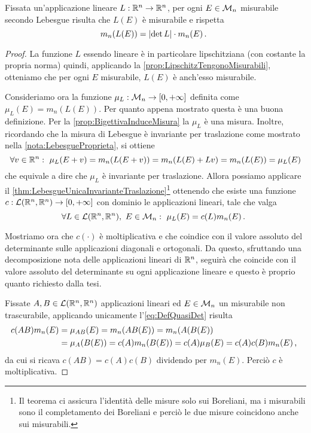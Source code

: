 \begin{proposition}\label{prop:MisuraImmagineLineare}
	Fissata un'applicazione lineare $L:\mathbb R^n\to\mathbb R^n$, per ogni $E\in\mathcal M_n$ misurabile secondo Lebesgue risulta che $L(E)$ è misurabile e rispetta
	\begin{equation}
		m_n(L(E))=\lvert \det L\rvert\cdot m_n(E)\, \text{. }
	\end{equation}
\end{proposition}
\begin{proof}
	La funzione $L$ essendo lineare è in particolare lipschitziana (con costante la propria norma) quindi, applicando la \cref{prop:LipschitzTengonoMisurabili}, otteniamo che per ogni $E$ misurabile, $L(E)$ è anch'esso misurabile.
	
	Consideriamo ora la funzione $\mu_L:\mathcal M_n\to[0,+\infty]$ definita come $\mu_L(E)=m_n(L(E))$. Per quanto appena mostrato questa è una buona definizione.
	Per la \cref{prop:BigettivaInduceMisura} la $\mu_L$ è una misura.
	Inoltre, ricordando che la misura di Lebesgue è invariante per traslazione come mostrato nella \cref{nota:LebesgueProprieta}, si ottiene
	\begin{equation*}
		\forall v\in\R^n:\ \mu_L(E+v)=m_n(L(E+v))=m_n(L(E)+Lv)=m_n(L(E))=\mu_L(E)
	\end{equation*}
	che equivale a dire che $\mu_L$ è invariante per traslazione.
	\newcommand{\linR}{\ensuremath{\mathcal L(\R^n,\R^n)}}
	Allora possiamo applicare il \cref{thm:LebesgueUnicaInvarianteTraslazione}\footnote{Il teorema ci assicura l'identità delle misure solo sui Boreliani, ma i misurabili sono il completamento dei Boreliani e perciò le due misure coincidono anche sui misurabili.} ottenendo che esiste una funzione $c:\linR\to\Rpiu$ con dominio le applicazioni lineari, tale che valga
	\begin{equation}\label{eq:DefQuasiDet}
		\forall L\in \linR,\ E\in\M_n:\ \mu_L(E)=c(L)m_n(E)\punto
	\end{equation}
	
	Mostriamo ora che $c(\cdot)$ è moltiplicativa e che coindice con il valore assoluto del determinante sulle applicazioni diagonali e ortogonali. Da questo, sfruttando una decomposizione nota delle applicazioni lineari di $\mathbb R^n$, seguirà che coincide con il valore assoluto del determinante su ogni applicazione lineare e questo è proprio quanto richiesto dalla tesi. 
	
	Fissate $A,B\in \linR$ applicazioni lineari ed $E\in\mathcal M_n$ un misurabile non trascurabile, applicando unicamente l'\cref{eq:DefQuasiDet} risulta
	\begin{align*}
		c(AB)m_n(E)&=\mu_{AB}(E)=m_n(AB(E))=m_n(A(B(E))\\
		&=\mu_A(B(E))=c(A)m_n(B(E))=c(A)\mu_B(E)=c(A)c(B)m_n(E)\, \text{, }
	\end{align*}
	da cui si ricava $c(AB)=c(A)c(B)$ dividendo per $m_n(E)$. Perciò $c$ è moltiplicativa.
	

\end{proof}
